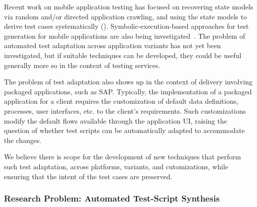 Recent work on mobile application testing has focused on recovering state models
via random and/or directed application crawling, and using the state models to
derive test cases systematically (\eg \cite{Amalfitano:2011, Amalfitano:2012,
  Choi:2013, Hu:2011, Joorabchi:2012, Yang:2013}). Symbolic-execution-based
approaches for test generation for mobile applications are also being
investigated~\cite{Anand:2012, Mirzaei:2012}. The problem of automated test
adaptation across application variants has not yet been investigated, but if
suitable techniques can be developed, they could be useful generally more so in
the context of testing services.


The problem of test adaptation also shows up in the context of delivery
involving packaged applications, such as SAP. Typically, the implementation of a
packaged application for a client requires the customization of default data
definitions, processes, user interfaces, etc. to the client's requirements. Such
customizations modify the default flows available through the application UI,
raising the question of whether test scripts can be automatically adapted to
accommodate the changes.

We believe there is scope for the development of new techniques that perform
such test adaptation, across platforms, variants, and cutomizations, while
ensuring that the intent of the test cases are preserved.

\subsubsection*{Research Problem: Automated Test-Script Synthesis}

